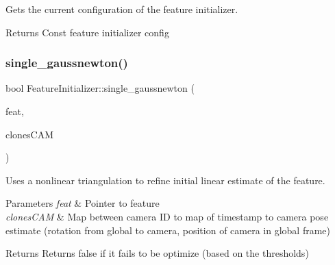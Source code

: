 Gets the current configuration of the feature initializer. 

\begin{DoxyReturn}{Returns}
Const feature initializer config 
\end{DoxyReturn}
\mbox{\label{classov__core_1_1FeatureInitializer_a27eb3af3c4e22473e795966eff800599}} 
\subsubsection{\texorpdfstring{single\+\_\+gaussnewton()}{single\_gaussnewton()}}
{\footnotesize\ttfamily bool Feature\+Initializer\+::single\+\_\+gaussnewton (\begin{DoxyParamCaption}\item[{std\+::shared\+\_\+ptr$<$ \hyperlink{classov__core_1_1Feature}{Feature} $>$}]{feat,  }\item[{std\+::unordered\+\_\+map$<$ size\+\_\+t, std\+::unordered\+\_\+map$<$ double, \hyperlink{structov__core_1_1FeatureInitializer_1_1ClonePose}{Clone\+Pose} $>$$>$ \&}]{clones\+C\+AM }\end{DoxyParamCaption})}



Uses a nonlinear triangulation to refine initial linear estimate of the feature. 


\begin{DoxyParams}{Parameters}
{\em feat} & Pointer to feature \\
\hline
{\em clones\+C\+AM} & Map between camera ID to map of timestamp to camera pose estimate (rotation from global to camera, position of camera in global frame) \\
\hline
\end{DoxyParams}
\begin{DoxyReturn}{Returns}
Returns false if it fails to be optimize (based on the thresholds) 
\end{DoxyReturn}
\mbox{\label{classov__core_1_1FeatureInitializer_a86e8f87f677689e6588516f8d08086d7}} 
